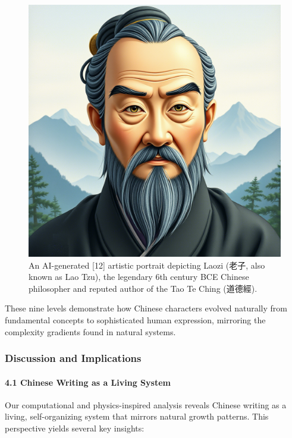 \begin{figure}
\centering
\includegraphics{./images/laozi-qwen-max.png}
\caption{An AI-generated {[}12{]} artistic portrait depicting Laozi
(老子, also known as Lao Tzu), the legendary 6th century BCE Chinese
philosopher and reputed author of the Tao Te Ching (道德經).}
\end{figure}

These nine levels demonstrate how Chinese characters evolved naturally
from fundamental concepts to sophisticated human expression, mirroring
the complexity gradients found in natural systems.

\subsubsection{Discussion and
Implications}\label{discussion-and-implications}

\paragraph{4.1 Chinese Writing as a Living
System}\label{chinese-writing-as-a-living-system}

Our computational and physics-inspired analysis reveals Chinese writing
as a living, self-organizing system that mirrors natural growth
patterns. This perspective yields several key insights:

